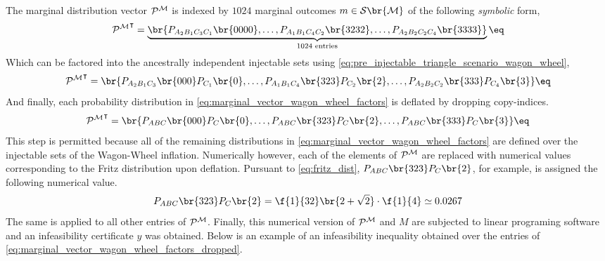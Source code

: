 \documentclass[aps, 10pt, english, twoside, pra, nofootinbib, tightenlines, longbibliography]{revtex4-1}
\renewcommand{\Events}[1]{\mathcal{S}\br{#1}} %
\begin{document}
    The marginal distribution vector $\probvec^{\mscenario}$ is indexed by $1024$ marginal outcomes $m \in \Events{\mscenario}$ of the following \textit{symbolic} form,
    \[ {\probvec^{\mscenario}}^{\intercal} = \underbrace{\br{\prob[A_2B_1C_3C_1]\br{0000}, \ldots, \prob[A_1B_1C_4C_2]\br{3232}, \ldots, \prob[A_2B_2C_2C_4]\br{3333}}}_{1024 \text{ entries}} \eq \label{eq:marginal_vector_wagon_wheel} \]
    Which can be factored into the ancestrally independent injectable sets using \cref{eq:pre_injectable_triangle_scenario_wagon_wheel},
    \[ {\probvec^{\mscenario}}^{\intercal} = \br{\prob[A_2B_1C_3]\br{000}\prob[C_1]\br{0}, \ldots, \prob[A_1B_1C_4]\br{323}\prob[C_2]\br{2}, \ldots, \prob[A_2B_2C_2]\br{333}\prob[C_4]\br{3}} \eq \label{eq:marginal_vector_wagon_wheel_factors}\]
    And finally, each probability distribution in \cref{eq:marginal_vector_wagon_wheel_factors} is deflated by dropping copy-indices.
    \[ {\probvec^{\mscenario}}^{\intercal} = \br{\prob[ABC]\br{000}\prob[C]\br{0}, \ldots, \prob[ABC]\br{323}\prob[C]\br{2}, \ldots, \prob[ABC]\br{333}\prob[C]\br{3}} \eq \label{eq:marginal_vector_wagon_wheel_factors_dropped}\]
    This step is permitted because all of the remaining distributions in \cref{eq:marginal_vector_wagon_wheel_factors} are defined over the injectable sets of the Wagon-Wheel inflation. Numerically however, each of the elements of $\probvec^{\mscenario}$ are replaced with numerical values corresponding to the Fritz distribution upon deflation. Pursuant to \cref{eq:fritz_dist}, $\prob[ABC]\br{323}\prob[C]\br{2}$, for example, is assigned the following numerical value.
    \[ \prob[ABC]\br{323}\prob[C]\br{2} = \f{1}{32}\br{2 + \sqrt{2}} \cdot \f{1}{4} \simeq 0.0267  \]
    The same is applied to all other entries of $\probvec^{\mscenario}$. Finally, this numerical version of $\probvec^{\mscenario}$ and $M$ are subjected to linear programing software and an infeasibility certificate $y$ was obtained. Below is an example of an infeasibility inequality obtained over the entries of \cref{eq:marginal_vector_wagon_wheel_factors_dropped}.
\end{document}
